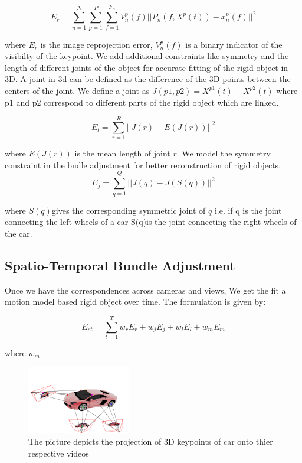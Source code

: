 \documentclass[10pt,twocolumn,letterpaper]{article}
\begin{document}
\begin{equation}
  	E_r =\sum_{n=1}^{N} \sum_{p=1}^P \sum_{f=1}^{F_n} V_n^p(f) ||P_n(f,X^p(t)) - x_n^p(f)||^2
\end{equation}
   
where $E_r$ is the image reprojection error, $V_n^p(f)$ is a binary indicator of the visibilty of the keypoint. We add additional constraints like symmetry and the length of different joints of the object for accurate fitting of the rigid object in 3D. A joint in 3d can be defined as the difference of the 3D points between the centers of the joint. We define a joint as $J(p1,p2) = X^{p1}(t) - X^{p2}(t) $ where p1 and p2 correspond to different parts of the rigid object which are linked. 

\begin{equation}
  	E_l = \sum_{r=1}^R ||J(r) - E(J(r))||^2  
\end{equation}

where $E(J(r))$ is the mean length of joint $r$. We model the symmetry constraint in the budle adjustment for better reconstruction of rigid objects.
\begin{equation}
  	E_j = \sum_{q = 1}^Q ||J(q) - J(S(q))||^2
\end{equation}

where $S(q)$gives the corresponding symmetric joint of $q$ i.e. if q is the joint connecting the left wheels of a car S(q)is the joint connecting the right wheels of the car.

\subsection{Spatio-Temporal Bundle Adjustment}
Once we have the correspondences across cameras and views, We get the fit a motion model based rigid object over time. The formulation is given by:

\begin{equation}
 E_{st} = \sum_{t=1}^T w_r E_r + w_j E_j + w_l E_l + w_m E_m 
\end{equation}

where $w_m$ 
\begin{figure}
  \centering
    \includegraphics[width=0.4\textwidth]{images/corr}
  \caption{The picture depicts the projection of 3D keypoints of car onto thier respective videos}
  \label{fig:corr}
\end{figure}
\end{document}
